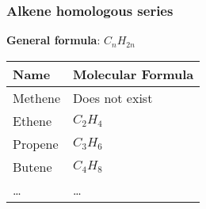 \documentclass[11pt]{article}
\begin{document}
\subsubsection{Alkene homologous series}
\label{sec:org1724178}
\textbf{General formula}: \(C_nH_{2n}\)
\begin{center}
\begin{tabular}{ll}
Name & Molecular Formula\\
\hline
Methene & Does not exist\\
Ethene & \(C_2H_4\)\\
Propene & \(C_3H_6\)\\
Butene & \(C_4H_8\)\\
\ldots{} & \ldots{}\\
\end{tabular}
\end{center}
\end{document}
